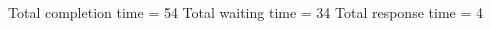 \begin{RTGrid}[width=0.8\textwidth]{5}{20}
\end{RTGrid}\newline\newline
Total completion time = 54\newline
Total waiting time = 34\newline
Total response time = 4\newline
